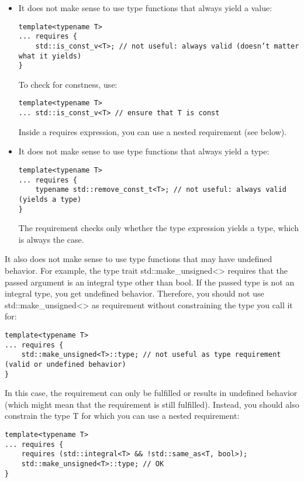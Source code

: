 \begin{itemize}
\item
It does not make sense to use type functions that always yield a value:

\begin{lstlisting}[style=styleCXX]
template<typename T>
... requires {
	std::is_const_v<T>; // not useful: always valid (doesn’t matter what it yields)
}
\end{lstlisting}

To check for constness, use:

\begin{lstlisting}[style=styleCXX]
template<typename T>
... std::is_const_v<T> // ensure that T is const
\end{lstlisting}

Inside a requires expression, you can use a nested requirement (see below).

\item
It does not make sense to use type functions that always yield a type:

\begin{lstlisting}[style=styleCXX]
template<typename T>
... requires {
	typename std::remove_const_t<T>; // not useful: always valid (yields a type)
}
\end{lstlisting}

The requirement checks only whether the type expression yields a type, which is always the case.
\end{itemize}

It also does not make sense to use type functions that may have undefined behavior. For example, the type trait std::make\_unsigned<> requires that the passed argument is an integral type other than bool. If the passed type is not an integral type, you get undefined behavior. Therefore, you should not use std::make\_unsigned<> as requirement without constraining the type you call it for:

\begin{lstlisting}[style=styleCXX]
template<typename T>
... requires {
	std::make_unsigned<T>::type; // not useful as type requirement (valid or undefined behavior)
}
\end{lstlisting}

In this case, the requirement can only be fulfilled or results in undefined behavior (which might mean that the requirement is still fulfilled). Instead, you should also constrain the type T for which you can use a nested requirement:

\begin{lstlisting}[style=styleCXX]
template<typename T>
... requires {
	requires (std::integral<T> && !std::same_as<T, bool>);
	std::make_unsigned<T>::type; // OK
}
\end{lstlisting}


